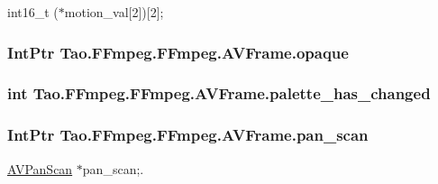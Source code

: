 int16\_\-t ($\ast$motion\_\-val\mbox{[}2\mbox{]})\mbox{[}2\mbox{]}; 

\hypertarget{struct_tao_1_1_f_fmpeg_1_1_f_fmpeg_1_1_a_v_frame_afe3e6a5b5f9752bbd7000b705985f76d}{
\subsubsection[{opaque}]{\setlength{\rightskip}{0pt plus 5cm}IntPtr {\bf Tao.FFmpeg.FFmpeg.AVFrame.opaque}}}
\label{struct_tao_1_1_f_fmpeg_1_1_f_fmpeg_1_1_a_v_frame_afe3e6a5b5f9752bbd7000b705985f76d}
\hypertarget{struct_tao_1_1_f_fmpeg_1_1_f_fmpeg_1_1_a_v_frame_a38c428a4f41cfeff795c51d747421803}{
\subsubsection[{palette\_\-has\_\-changed}]{\setlength{\rightskip}{0pt plus 5cm}int {\bf Tao.FFmpeg.FFmpeg.AVFrame.palette\_\-has\_\-changed}}}
\label{struct_tao_1_1_f_fmpeg_1_1_f_fmpeg_1_1_a_v_frame_a38c428a4f41cfeff795c51d747421803}
\hypertarget{struct_tao_1_1_f_fmpeg_1_1_f_fmpeg_1_1_a_v_frame_a08f1d39a5c2b75e018d64036607f86eb}{
\subsubsection[{pan\_\-scan}]{\setlength{\rightskip}{0pt plus 5cm}IntPtr {\bf Tao.FFmpeg.FFmpeg.AVFrame.pan\_\-scan}}}
\label{struct_tao_1_1_f_fmpeg_1_1_f_fmpeg_1_1_a_v_frame_a08f1d39a5c2b75e018d64036607f86eb}


\hyperlink{struct_tao_1_1_f_fmpeg_1_1_f_fmpeg_1_1_a_v_pan_scan}{AVPanScan} $\ast$pan\_\-scan;. 


